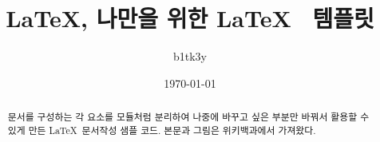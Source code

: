 \documentclass[hangul, 11pt, chapter, oneside, openany]{oblivoir}
\title{\LaTeX, 나만을 위한 \LaTeX~ 템플릿}
\author{b1tk3y}
\date{\today}
\begin{document}
\maketitle

\begin{abstract}
문서를 구성하는 각 요소를 모듈처럼 분리하여
나중에 바꾸고 싶은 부분만 바꿔서 활용할 수 있게 만든 \LaTeX~문서작성 샘플 코드.
본문과 그림은 위키백과에서 가져왔다.
\end{abstract}

\clearpage

\tableofcontents*

\pagestyle{jeju}

\end{document}

